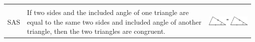 \begin{center}
\begin{xtabular*}{\mytablewidth}[t]{|p{10\mystarwidth}|p{10\mystarwidth}|p{10\mystarwidth}|}
\begin{center}
      \vspace{2pt}
    \vspace{.1in}
    
    \end{center}



    \addtocounter{footnote}{-0}
    
     \tabularnewline{}
    
    
        SAS &
    
    
        If two sides and the included angle of one triangle are equal to the same two sides and included angle of another triangle, then the two triangles are congruent. &
    
    
        
                    
    \setcounter{subfigure}{0}

\label{m39368*id318143}
    \begin{center}
    \label{m39368*id318143!!!underscore!!!media}\label{m39368*id318143!!!underscore!!!printimage}\includegraphics[width=.25\columnwidth]{col11306.imgs/m39368_MG10C13_033.png} %
        
      \vspace{2pt}
    \vspace{.1in}
    
    \end{center}



    \addtocounter{footnote}{-0}
    
     \tabularnewline{}
    

\end{xtabular*}
\end{center}
